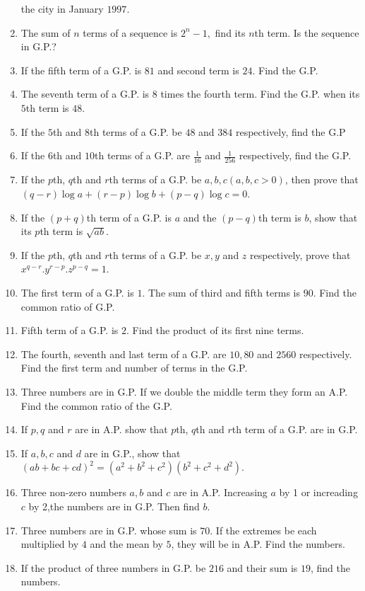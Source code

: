 \begin{enumerate}
  the city in January $1997$.
\item The sum of $n$ terms of a sequence is $2^n - 1,$ find its $n$th term. Is the sequence in G.P.?
\item If the fifth term of a G.P. is $81$ and second term is $24$. Find the G.P.
\item The seventh term of a G.P. is $8$ times the fourth term. Find the G.P. when its $5$th term is $48$.
\item If the $5$th and $8$th terms of a G.P. be $48$ and $384$ respectively, find the G.P
\item If the $6$th and $10$th terms of a G.P. are $\frac{1}{16}$ and $\frac{1}{256}$ respectively, find the G.P.
\item If the $p$th, $q$th and $r$th terms of a G.P. be $a, b, c (a, b, c >0)$, then prove that $(q - r)\log a + (r - p)\log b + (p
  - q)\log c = 0$.
\item If the $(p + q)$th term of a G.P. is $a$ and the $(p - q)$th term is $b$, show that its $p$th term is $\sqrt{ab}$.
\item If the $p$th, $q$th and $r$th terms of a G.P. be $x, y$ and $z$ respectively, prove that $x^{q - r}.y^{r - p}.z^{p - q} = 1$.
\item The first term of a G.P. is $1$. The sum of third and fifth terms is $90$. Find the common ratio of G.P.
\item Fifth term of a G.P. is $2$. Find the product of its first nine terms.
\item The fourth, seventh and last term of a G.P. are $10, 80$ and $2560$ respectively. Find the first term and number of terms in
  the G.P.
\item Three numbers are in G.P. If we double the middle term they form an A.P. Find the common ratio of the G.P.
\item If $p, q$ and $r$ are in A.P. show that $p$th, $q$th and $r$th term of a G.P. are in G.P.
\item If $a, b, c$ and $d$ are in G.P., show that $(ab + bc + cd)^2 = (a^2 + b^2 + c^2)(b^2 + c^2 + d^2)$.
\item Three non-zero numbers $a, b$ and $c$ are in A.P. Increasing $a$ by 1 or increading $c$ by 2,the numbers are in G.P. Then
  find $b$.
\item Three numbers are in G.P. whose sum is $70$. If the extremes be each multiplied by $4$ and the mean by $5$, they will be in
  A.P. Find the numbers.
\item If the product of three numbers in G.P. be $216$ and their sum is $19$, find the numbers.

\end{enumerate}
